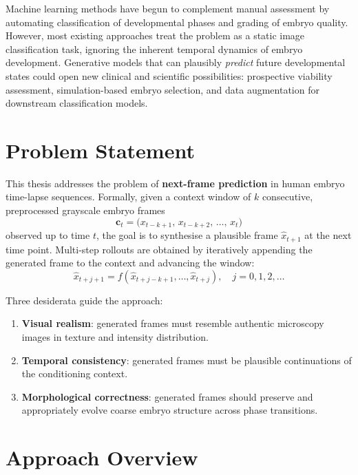 \documentclass[12pt, a4paper, twoside]{report}
\begin{document}
Machine learning methods have begun to complement manual assessment by
automating classification of developmental phases and grading of embryo
quality.
However, most existing approaches treat the problem as a static image
classification task, ignoring the inherent temporal dynamics of embryo
development.
Generative models that can plausibly \emph{predict} future developmental
states could open new clinical and scientific possibilities: prospective
viability assessment, simulation-based embryo selection, and data augmentation
for downstream classification models.

\section{Problem Statement}
\label{sec:problem}

This thesis addresses the problem of \textbf{next-frame prediction} in human
embryo time-lapse sequences.
Formally, given a context window of $k$ consecutive, preprocessed grayscale
embryo frames
\[
  \mathbf{c}_t = \bigl(x_{t-k+1}, \, x_{t-k+2}, \, \ldots, \, x_t\bigr)
\]
observed up to time $t$, the goal is to synthesise a plausible frame
$\hat{x}_{t+1}$ at the next time point.
Multi-step rollouts are obtained by iteratively appending the generated frame
to the context and advancing the window:
\[
  \hat{x}_{t+j+1} = f\!\left(\hat{x}_{t+j-k+1}, \ldots, \hat{x}_{t+j}\right),
  \quad j = 0, 1, 2, \ldots
\]

Three desiderata guide the approach:
\begin{enumerate}[label=(\roman*)]
  \item \textbf{Visual realism}: generated frames must resemble authentic
        microscopy images in texture and intensity distribution.
  \item \textbf{Temporal consistency}: generated frames must be plausible
        continuations of the conditioning context.
  \item \textbf{Morphological correctness}: generated frames should preserve
        and appropriately evolve coarse embryo structure across phase
        transitions.
\end{enumerate}

\section{Approach Overview}
\label{sec:approach}
\end{document}

